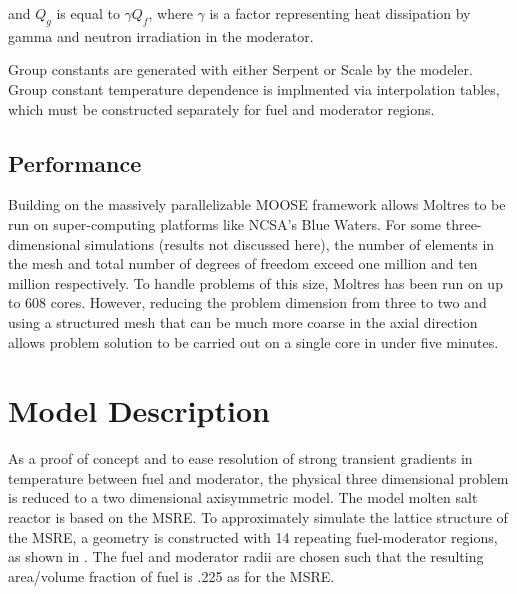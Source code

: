 \documentclass{article}
\let\Oldsection\section
\renewcommand{\section}{\FloatBarrier\Oldsection}
\let\Oldsubsection\subsection
\renewcommand{\subsection}{\FloatBarrier\Oldsubsection}
\begin{document}
and $Q_g$ is equal to $\gamma Q_f$, where $\gamma$ is a factor representing 
heat dissipation by gamma and neutron irradiation in the moderator.

Group constants are generated with either Serpent \cite{leppanen_serpent_2015} 
or Scale \cite{dehart_reactor_2011} by the modeler. Group constant temperature 
dependence is implmented via interpolation tables, which must be constructed 
separately for fuel and moderator regions.

\subsection{Performance}

Building on the massively parallelizable \gls{MOOSE} framework allows Moltres 
to be run on super-computing platforms like \gls{NCSA}'s Blue Waters. For some 
three-dimensional simulations (results not discussed here), the number of 
elements in the mesh and total number of degrees of freedom exceed one million 
and ten million respectively. To handle problems of this size, Moltres has been 
run on up to 608 cores. However, reducing the problem dimension from three to 
two and using a structured mesh that can be much more coarse in the axial 
direction allows problem solution to be carried out on a single core in under 
five minutes.

\section{Model Description}

As a proof of concept and to ease resolution of strong transient gradients in
temperature between fuel and moderator, the physical three dimensional problem
is reduced to a two dimensional axisymmetric model. The model molten salt
reactor is based on the \gls{MSRE}. To approximately simulate the lattice
structure of the \gls{MSRE}, a geometry is constructed with 14 repeating
fuel-moderator regions, as shown in . The fuel and moderator
radii are chosen such that the resulting area/volume fraction of fuel is .225 as
for the \gls{MSRE}.
\end{document}
